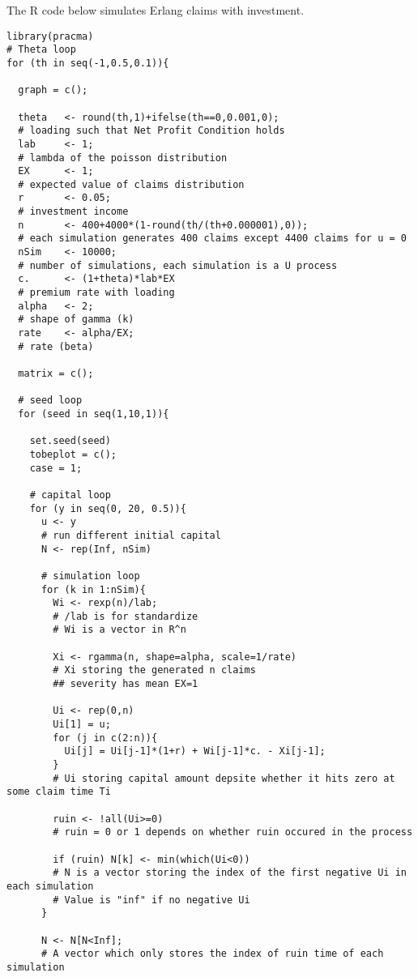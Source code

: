 \documentclass[12pt]{article}
\begin{document}
\newpage
The R code below simulates Erlang claims with investment.
\begin{lstlisting}
library(pracma)
# Theta loop
for (th in seq(-1,0.5,0.1)){
  
  graph = c();
  
  theta   <- round(th,1)+ifelse(th==0,0.001,0);
  # loading such that Net Profit Condition holds
  lab     <- 1;                
  # lambda of the poisson distribution
  EX      <- 1;                
  # expected value of claims distribution
  r       <- 0.05;                
  # investment income
  n       <- 400+4000*(1-round(th/(th+0.000001),0));
  # each simulation generates 400 claims except 4400 claims for u = 0
  nSim    <- 10000;            
  # number of simulations, each simulation is a U process
  c.      <- (1+theta)*lab*EX  
  # premium rate with loading
  alpha   <- 2;                
  # shape of gamma (k)
  rate    <- alpha/EX;         
  # rate (beta)
  
  matrix = c();
  
  # seed loop
  for (seed in seq(1,10,1)){
      
    set.seed(seed)
    tobeplot = c();
    case = 1;
    
    # capital loop
    for (y in seq(0, 20, 0.5)){
      u <- y                 
      # run different initial capital
      N <- rep(Inf, nSim)
      
      # simulation loop
      for (k in 1:nSim){
        Wi <- rexp(n)/lab; 
        # /lab is for standardize
        # Wi is a vector in R^n
        
        Xi <- rgamma(n, shape=alpha, scale=1/rate)
        # Xi storing the generated n claims
        ## severity has mean EX=1
        
        Ui <- rep(0,n)
        Ui[1] = u;
        for (j in c(2:n)){
          Ui[j] = Ui[j-1]*(1+r) + Wi[j-1]*c. - Xi[j-1];
        }
        # Ui storing capital amount depsite whether it hits zero at some claim time Ti
        
        ruin <- !all(Ui>=0)
        # ruin = 0 or 1 depends on whether ruin occured in the process
        
        if (ruin) N[k] <- min(which(Ui<0))
        # N is a vector storing the index of the first negative Ui in each simulation
        # Value is "inf" if no negative Ui
      }
      
      N <- N[N<Inf]; 
      # A vector which only stores the index of ruin time of each simulation 
      

\end{lstlisting}
\end{document}

